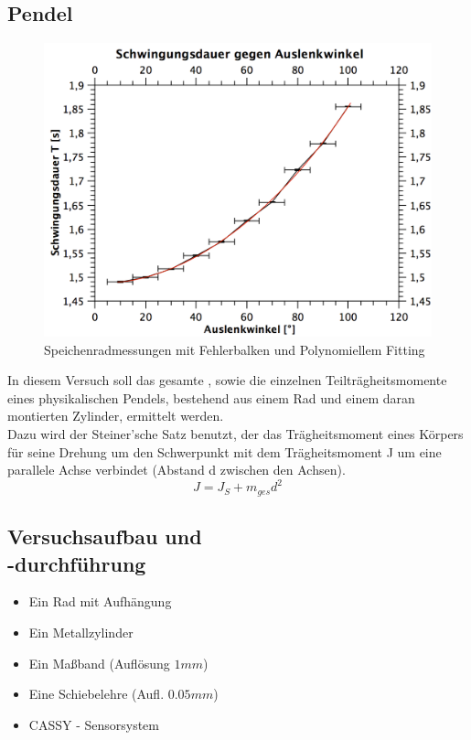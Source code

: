 \documentclass[12pt,a4paper]{article}
\begin{document}
\begin{multicols}{2}
\section{Pendel}
\begin{figure}[H]
	\centering
  	\includegraphics[scale=0.45]{./figure/speichenrad_fit_error.png}
	\caption{Speichenradmessungen mit Fehlerbalken und Polynomiellem Fitting}
	\label{fig:rad_fit}
\end{figure}
\noindent
In diesem Versuch soll das gesamte , sowie die einzelnen Teilträgheitsmomente eines physikalischen Pendels, bestehend aus einem Rad und einem daran montierten Zylinder, ermittelt werden.\\
Dazu wird der Steiner'sche Satz benutzt, der das Trägheitsmoment eines Körpers für seine Drehung um den Schwerpunkt mit dem Trägheitsmoment J um eine parallele Achse verbindet (Abstand d zwischen den Achsen).\\
$$ J = J_{S} + m_{ges}d^2 $$

\subsection{Versuchsaufbau und \\-durchführung}

\begin{itemize}
	\item Ein Rad mit Aufhängung
	\item Ein Metallzylinder
	\item Ein Maßband (Auflösung $1 mm$)
	\item Eine Schiebelehre (Aufl. $0.05mm$)
	\item CASSY - Sensorsystem
\end{itemize}


\end{multicols}
\end{document}
